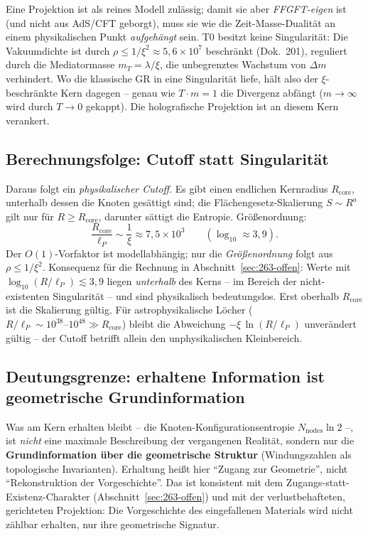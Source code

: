 Eine Projektion ist als reines Modell zulässig; damit sie aber
\emph{FFGFT-eigen} ist (und nicht aus AdS/CFT geborgt), muss sie wie die
Zeit-Masse-Dualität an einem physikalischen Punkt \emph{aufgehängt} sein. T0
besitzt keine Singularität: Die Vakuumdichte ist durch
$\rho \le 1/\xi^2 \approx 5{,}6\times10^{7}$ beschränkt (Dok.~201), reguliert
durch die Mediatormasse $m_T = \lambda/\xi$, die unbegrenztes Wachstum von
$\Delta m$ verhindert. Wo die klassische GR in eine Singularität liefe, hält
also der $\xi$-beschränkte Kern dagegen -- genau wie $T\cdot m=1$ die
Divergenz abfängt ($m\to\infty$ wird durch $T\to 0$ gekappt). Die
holografische Projektion ist an diesem Kern verankert.

\subsection*{Berechnungsfolge: Cutoff statt Singularität}

Daraus folgt ein \emph{physikalischer Cutoff}. Es gibt einen endlichen
Kernradius $R_\text{core}$, unterhalb dessen die Knoten gesättigt sind; die
Flächengesetz-Skalierung $S \sim R^{a}$ gilt nur für $R \ge R_\text{core}$,
darunter sättigt die Entropie. Größenordnung:
\[
  \frac{R_\text{core}}{\ell_P} \sim \frac{1}{\xi} \approx 7{,}5\times10^{3}
  \qquad (\log_{10} \approx 3{,}9).
\]
Der $O(1)$-Vorfaktor ist modellabhängig; nur die \emph{Größenordnung} folgt
aus $\rho \le 1/\xi^2$. Konsequenz für die Rechnung in
Abschnitt~\ref{sec:263-offen}: Werte mit $\log_{10}(R/\ell_P) \lesssim 3{,}9$
liegen \emph{unterhalb} des Kerns -- im Bereich der nicht-existenten
Singularität -- und sind physikalisch bedeutungslos. Erst oberhalb
$R_\text{core}$ ist die Skalierung gültig. Für astrophysikalische Löcher
($R/\ell_P \sim 10^{38}\text{--}10^{48} \gg R_\text{core}$) bleibt die
Abweichung $-\xi\,\ln(R/\ell_P)$ unverändert gültig -- der Cutoff betrifft
allein den unphysikalischen Kleinbereich.

\subsection*{Deutungsgrenze: erhaltene Information ist geometrische Grundinformation}

Was am Kern erhalten bleibt -- die Knoten-Konfigurationsentropie
$N_\text{nodes}\ln 2$ --, ist \emph{nicht} eine maximale Beschreibung der
vergangenen Realität, sondern nur die \textbf{Grundinformation über die
geometrische Struktur} (Windungszahlen als topologische Invarianten).
Erhaltung heißt hier \enquote{Zugang zur Geometrie}, nicht
\enquote{Rekonstruktion der Vorgeschichte}. Das ist konsistent mit dem
Zugangs-statt-Existenz-Charakter (Abschnitt~\ref{sec:263-offen}) und mit der
verlustbehafteten, gerichteten Projektion: Die Vorgeschichte des
eingefallenen Materials wird nicht zählbar erhalten, nur ihre geometrische
Signatur.

